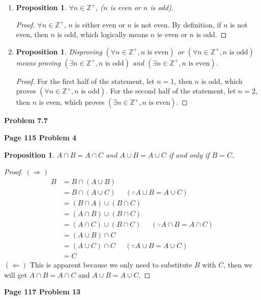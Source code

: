 \documentclass{article}
\newtheorem{prop}[thm]{Proposition}
\begin{document}
\begin{enumerate}[label={(\roman*)}]
    \item 
    \begin{prop}
        $\forall n \in \mathbb{Z^+}$, ($n$ is even or $n$ is odd).
    \end{prop}
    \begin{proof}
        $\forall n \in \mathbb{Z^+}$, $n$ is either even or $n$ is not even. 
        By definition, if $n$ is not even, then $n$ is odd, which logically means $n$ ie even or $n$ is odd.
    \end{proof}

    \item 
    \begin{prop}
        Disproving $(\forall n \in \mathbb{Z^+}, n \text{ is even})$ or $(\forall n \in \mathbb{Z^+}, n \text{ is odd})$ means proving $(\exists n \in \mathbb{Z^+}, n \text{ is odd})$ and $(\exists n \in \mathbb{Z^+}, n \text{ is even})$.
    \end{prop}
    \begin{proof}
        For the first half of the statement, let $n = 1$, then $n$ is odd, which proves $(\forall n \in \mathbb{Z^+}, n \text{ is odd})$. 
        For the second half of the statement, let $n = 2$, then $n$ is even, which proves $(\exists n \in \mathbb{Z^+}, n \text{ is even})$.
    \end{proof}
\end{enumerate}
\bigbreak

\textbf{Problem 7.7}
\bigbreak

\textbf{Page 115 Problem 4}
\begin{prop}
    $A \cap B = A \cap C$ and $A \cup B = A \cup C$ if and only if $B = C$.
\end{prop}
\begin{proof}
    $(\Rightarrow)$ 
    \begin{align}
        B & = B \cap (A \cup B) \\
        & = B \cap (A \cup C) \;\;\;\;\; (\because A \cup B = A \cup C) \\
        & = (B \cap A) \cup (B \cap C) \\
        & = (A \cap B) \cup (B \cap C) \\
        & = (A \cap C) \cup (B \cap C) \;\;\;\;\; (\because A \cap B = A \cap C)\\
        & = (A \cup B) \cap C \\
        & = (A \cup C) \cap C \;\;\;\;\; (\because A \cup B = A \cup C) \\
        & = C
    \end{align}
    $(\Leftarrow)$ This is apparent because we only need to substitute $B$ with $C$, then we will get $A \cap B = A \cap C$ and $A \cup B = A \cup C$.
\end{proof}
\bigbreak

\textbf{Page 117 Problem 13}

\bigbreak
\end{document}

